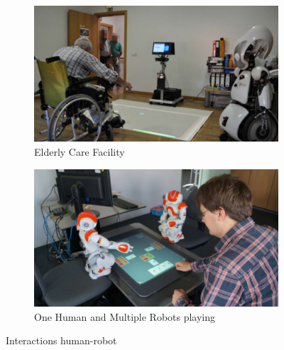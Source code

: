 \documentclass{article}
\begin{document}
\begin{figure}[H]
    \centering
    \begin{subfigure}{.5\textwidth}
      \centering
      \includegraphics[width=0.8\linewidth]{images/old.png}
      \caption{Elderly Care Facility}
    \end{subfigure}%
    \begin{subfigure}{.5\textwidth}
      \centering
      \includegraphics[width=0.8\linewidth]{images/multiple.png}
      \caption{One Human and Multiple Robots playing}
    \end{subfigure} 
    \caption{Interactions human-robot}
    \label{fig:interactions}
\end{figure}
\end{document}
